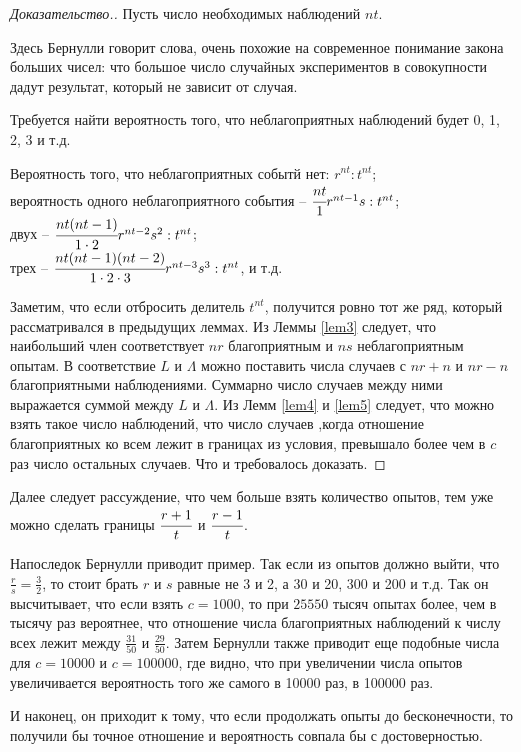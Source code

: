 \documentclass[12pt]{extarticle}
\begin{document}
\begin{proof}[Доказательство.]
Пусть число необходимых наблюдений $nt$.

Здесь Бернулли говорит слова, очень похожие на современное понимание закона больших чисел: что большое число случайных экспериментов в совокупности дадут результат, который не зависит от случая.

Требуется найти вероятность того, что неблагоприятных наблюдений будет 0, 1, 2, 3 и т.д.

Вероятность того, что неблагоприятных событй нет: $r^{nt} : t^{nt}$;\\
вероятность одного неблагоприятного события -- $\cfrac{nt}{1} r^{nt-1} s : t^{nt}$;\\
двух -- $\cfrac{nt(nt-1)}{1 \cdot 2} r^{nt-2} s^2 : t^{nt}$;\\
трех -- $\cfrac{nt(nt-1)(nt-2)}{1 \cdot 2 \cdot 3} r^{nt-3} s^3 : t^{nt}$, и т.д.

Заметим, что если отбросить делитель $t^{nt}$, получится ровно тот же ряд, который рассматривался в предыдущих леммах.
Из Леммы \ref{lem3} следует, что наибольший член соответствует $nr$ благоприятным и $ns$ неблагоприятным опытам.
В соответствие $L$ и $\Lambda$ можно поставить числа случаев с $nr+n$ и $nr-n$ благоприятными наблюдениями.
Суммарно число случаев между ними выражается суммой между $L$ и $\Lambda$.
Из Лемм \ref{lem4} и \ref{lem5} следует, что можно взять такое число наблюдений, что число случаев ,когда отношение благоприятных ко всем лежит в границах из условия, превышало более чем в  $c$ раз число остальных случаев.
Что и требовалось доказать.
\end{proof}

Далее следует рассуждение, что чем больше взять количество опытов, тем уже можно сделать границы $\cfrac{r+1}{t}$ и $\cfrac{r-1}{t}$.

Напоследок Бернулли приводит пример. 
Так если из опытов должно выйти, что $\frac{r}{s} = \frac{3}{2}$, то стоит брать $r$ и $s$ равные не 3 и 2, а 30 и 20, 300 и 200 и т.д.
Так он высчитывает, что если взять $c=1000$,  то при $25550$ тысяч опытах более, чем в тысячу раз вероятнее, что  отношение числа благоприятных наблюдений к числу всех лежит между $\frac{31}{50}$ и $\frac{29}{50}$.
Затем Бернулли также приводит еще подобные числа для $c=10000$ и $c=100000$, где видно, что при увеличении числа опытов увеличивается вероятность того же самого в 10000 раз, в 100000 раз.

И наконец, он приходит к тому, что если продолжать опыты до бесконечности, то получили бы точное отношение и вероятность совпала бы с достоверностью.
\end{document}
